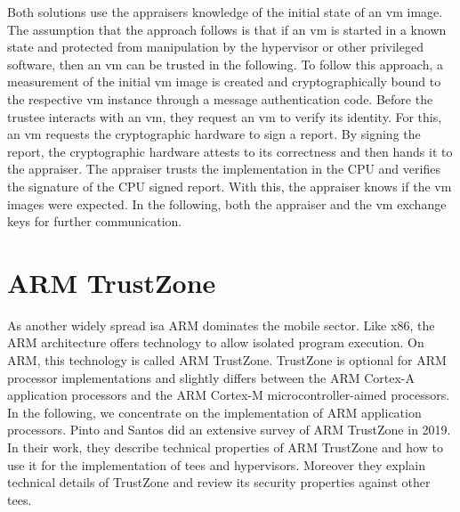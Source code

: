 Both solutions use the appraisers knowledge of the initial state of an \gls{vm}
image. The assumption that the approach follows is that if an \gls{vm} is
started in a known state and protected from manipulation by the hypervisor or
other privileged software, then an \gls{vm} can be trusted in the following. To
follow this approach, a measurement of the initial \gls{vm} image is created and
cryptographically bound to the respective \gls{vm} instance through a message
authentication code. Before the trustee interacts with an \gls{vm}, they
request an \gls{vm} to verify its identity. For this, an \gls{vm} requests the
cryptographic hardware to sign a report. By signing the report, the
cryptographic hardware attests to its correctness and then hands it to the
appraiser. The appraiser trusts the implementation in the CPU and verifies the
signature of the CPU signed report. With this, the appraiser knows if the
\gls{vm} images were expected. In the following, both the appraiser and the
\gls{vm} exchange keys for further communication.\\

\section{ARM TrustZone}
\label{sec:20:trustzone}
As another widely spread \gls{isa} ARM dominates the mobile sector. Like x86,
the ARM architecture offers technology to allow isolated program execution. On
ARM, this technology is called ARM TrustZone. TrustZone is optional for ARM
processor implementations and slightly differs between the ARM Cortex-A
application processors and the ARM Cortex-M microcontroller-aimed processors. In
the following, we concentrate on the implementation of ARM application
processors. Pinto and Santos did an extensive survey of ARM TrustZone in 2019.
In their work, they describe technical properties of ARM TrustZone and how to
use it for the implementation of \glspl{tee} and hypervisors. Moreover they
explain technical details of TrustZone and review its security properties
against other \glspl{tee}.\cite{pinto_demystifying_2019}\\

